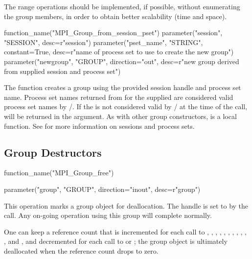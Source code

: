 \begin{implementors}
The range operations should be implemented, if possible, without
enumerating the group members,
in order to obtain better scalability (time and space).
\end{implementors}

\begin{mpi-binding}
    function_name("MPI_Group_from_session_pset")
    parameter("session", "SESSION", desc=r"session")
    parameter("pset_name", "STRING", constant=True, desc=r"name of process set to use to create the new group")
    parameter("newgroup", "GROUP", direction="out", desc=r"new group derived from supplied session and process set")
\end{mpi-binding}

The function  creates a group
 using the provided session handle and process set name.
Process set names returned from  for the supplied  are considered valid process set names by \MPI/.
If the  is not considered valid by \MPI/ at the time of the call,  will be returned in the  argument.
As with other group constructors,  is a local function.
See  for more information on sessions and process sets.

\subsection{Group Destructors}
\label{subsec:context-grpdest}

%
\begin{mpi-binding}
    function_name("MPI_Group_free")
    
    parameter("group", "GROUP", direction="inout", desc=r"group")
\end{mpi-binding}

This operation marks a group object for deallocation. The handle
 is set to  by the call.
Any on-going operation using this group will complete normally.

\begin{implementors}
\begin{sloppy}
  One can keep a reference count that is incremented for each call to
  , ,
  , , ,
  \vlgb{}, , ,
  , ,
  , and  , \gb{}and
  decremented for each call to  or
  ; the group object is ultimately deallocated when the
  reference count drops to zero.
\end{sloppy}
\end{implementors}

